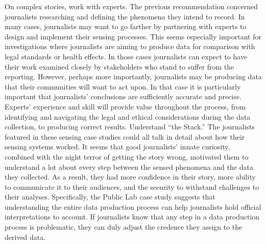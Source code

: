 On complex stories, work with experts.
The previous recommendation concerned journalists researching and defining
the phenomena they intend to record. In many cases, journalists may
want to go farther by partnering with experts to design and implement their
sensing processes. This seems especially important for investigations where
journalists are aiming to produce data for comparison with legal standards
or health effects. In those cases journalists can expect to have their work
examined closely by stakeholders who stand to suffer from the reporting.
However, perhaps more importantly, journalists may be producing data
that their communities will want to act upon. In that case it is particularly
important that journalists' conclusions are sufficiently accurate and precise.
Experts' experience and skill will provide value throughout the process,
from identifying and navigating the legal and ethical considerations during
the data collection, to producing correct results.
Understand ``the Stack.''
The journalists featured in these sensing case studies could all talk in detail
about how their sensing systems worked. It seems that good journalists'
innate curiosity, combined with the night terror of getting the story wrong,
motivated them to understand a lot about every step between the sensed
phenomena and the data they collected. As a result, they had more confidence
in their story, more ability to communicate it to their audiences,
and the security to withstand challenges to their analyses. Specifically, the
Public Lab case study suggests that understanding the entire data production
process can help journalists hold official interpretations to account. If
journalists know that any step in a data production process is problematic,
they can duly adjust the credence they assign to the derived data.

